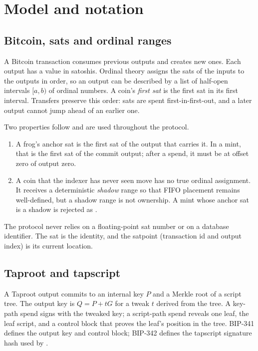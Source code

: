 \section{Model and notation}\label{sec:model}

\subsection{Bitcoin, sats and ordinal ranges}

A Bitcoin transaction consumes previous outputs and creates new ones. Each
output has a value in satoshis. Ordinal theory assigns the sats of the inputs
to the outputs in order, so an output can be described by a list of half-open
intervals $[a,b)$ of ordinal numbers. A coin's \emph{first sat} is the first
sat in its first interval. Transfers preserve this order: sats are spent
first-in-first-out, and a later output cannot jump ahead of an earlier one.

Two properties follow and are used throughout the protocol.

\begin{enumerate}[leftmargin=1.6em,itemsep=0.2em]
  \item A frog's anchor sat is the first sat of the output that carries it.
        In a mint, that is the first sat of the commit output; after a spend,
        it must be at offset zero of output zero.
  \item A coin that the indexer has never seen move has no true ordinal
        assignment. It receives a deterministic \emph{shadow} range so that
        FIFO placement remains well-defined, but a shadow range is not
        ownership. A mint whose anchor sat is a shadow is rejected as
        .
\end{enumerate}

The protocol never relies on a floating-point sat number or on a database
identifier. The sat is the identity, and the satpoint (transaction id and
output index) is its current location.

\subsection{Taproot and tapscript}

A Taproot output commits to an internal key $P$ and a Merkle root of a script
tree. The output key is $Q = P + tG$ for a tweak $t$ derived from the tree.
A key-path spend signs with the tweaked key; a script-path spend reveals one
leaf, the leaf script, and a control block that proves the leaf's position in
the tree. BIP-341 \cite{bip341} defines the output key and control block; BIP-342
\cite{bip342} defines the tapscript signature hash used by
.

